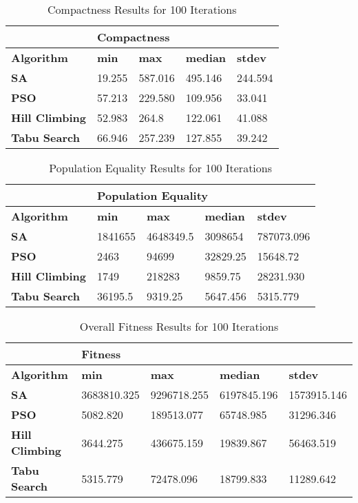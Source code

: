 \documentclass[journal]{IEEEtran}
\begin{document}
\begin{table}[!h]
\centering
\caption{Compactness Results for 100 Iterations}
\label{comp_100iter}
\begin{tabular}{l|llll}
                       & \multicolumn{4}{l}{\textbf{Compactness}}                      \\ \hline
\textbf{Algorithm}     & \textbf{min} & \textbf{max} & \textbf{median} & \textbf{stdev} \\ \hline
\textbf{SA}            & 19.255       & 587.016      & 495.146         & 244.594       \\
\textbf{PSO}           & 57.213       & 229.580      & 109.956         & 33.041         \\
\textbf{Hill Climbing} & 52.983       & 264.8        & 122.061         & 41.088         \\
\textbf{Tabu Search}   & 66.946       & 257.239      & 127.855         & 39.242            
\end{tabular}
\end{table}

\begin{table}[!h]
\centering
\caption{Population Equality Results for 100 Iterations}
\label{pop_100iter}
\begin{tabular}{l|llll}
                       & \multicolumn{4}{l}{\textbf{Population Equality}}             \\ \hline
\textbf{Algorithm}     & \textbf{min} & \textbf{max} & \textbf{median} & \textbf{stdev} \\ \hline
\textbf{SA}            & 1841655      & 4648349.5    & 3098654         & 787073.096         \\
\textbf{PSO}           & 2463         & 94699        & 32829.25        & 15648.72           \\
\textbf{Hill Climbing} & 1749         & 218283       & 9859.75         & 28231.930        \\
\textbf{Tabu Search}   & 36195.5      & 9319.25         & 5647.456       & 5315.779     
\end{tabular}
\end{table}

\begin{table}[!h]
\centering
\caption{Overall Fitness Results for 100 Iterations}
\label{fitness_100iter}
\begin{tabular}{l|llll}
                       & \multicolumn{4}{l}{\textbf{Fitness}}                          \\ \hline
\textbf{Algorithm}     & \textbf{min} & \textbf{max} & \textbf{median} & \textbf{stdev} \\ \hline
\textbf{SA}            & 3683810.325  & 9296718.255  & 6197845.196     & 1573915.146    \\
\textbf{PSO}           & 5082.820     & 189513.077   & 65748.985       & 31296.346      \\
\textbf{Hill Climbing} & 3644.275     & 436675.159   & 19839.867       & 56463.519      \\
\textbf{Tabu Search}   & 5315.779     & 72478.096    & 18799.833       & 11289.642     
\end{tabular}
\end{table}
\end{document}
